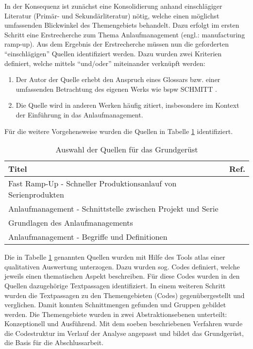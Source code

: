 In der Konsequenz ist zunächst eine Konsolidierung anhand einschlägiger Literatur (Primär- und Sekundärliteratur) nötig, welche einen möglichst umfassenden Blickwinkel des Themengebiets behandelt. Dazu erfolgt im ersten Schritt eine Erstrecherche zum Thema Anlaufmanagement (engl.: manufacturing ramp-up). Aus dem Ergebnis der Erstrecherche müssen nun die geforderten ``einschlägigen'' Quellen identifiziert werden. Dazu wurden zwei Kriterien definiert, welche mittels ``und/oder'' miteinander verknüpft werden: 
\begin{enumerate}
 \item Der Autor der Quelle erhebt den Anspruch eines Glossars bzw. einer umfassenden Betrachtung des eigenen Werks wie \gls{bspw} SCHMITT \autocite{Schmitt2015}. 
 \item Die Quelle wird in anderen Werken häufig zitiert, insbesondere im Kontext der Einführung in das Anlaufmanagement. 
\end{enumerate}

Für die weitere Vorgehensweise wurden die Quellen in Tabelle \ref{tab:quellengrundgeruest} identifiziert. 
% 
\begin{table}[h]
\caption{ Auswahl der Quellen für das Grundgerüst} \label{tab:quellengrundgeruest} 
\begin{center}
\begin{tabular}{l r}
\textbf{Titel} & \textbf{Ref.} \\ \hline
Fast Ramp-Up - Schneller Produktionsanlauf von Serienprodukten & \autocite{Kuhn2002} \\
Anlaufmanagement - Schnittstelle zwischen Projekt und Serie & \autocite{Bischoff2007} \\
Grundlagen des Anlaufmanagements & \autocite{Schuh2008} \\
Anlaufmanagement - Begriffe und Definitionen & \autocite{Schmitt2015} 
 \end{tabular} 
 \end{center}
\end{table}
% 
% 
Die in Tabelle \ref{tab:quellengrundgeruest} genannten Quellen wurden mit Hilfe des Tools \gls{atlas} 
einer qualitativen Auswertung unterzogen. Dazu wurden sog. Codes definiert, welche jeweils einen thematischen Aspekt beschreiben. Für diese Codes wurden in den Quellen dazugehörige Textpassagen identifiziert. In einem weiteren Schritt wurden die Textpassagen zu den Themengebieten (Codes) gegenübergestellt und verglichen. Damit konnten Schnittmengen gefunden und Gruppen gebildet werden. Die Themengebiete wurden in zwei Abstraktionsebenen unterteilt: Konzeptionell und Ausführend.
Mit dem soeben beschriebenen Verfahren wurde die Codestruktur im Verlauf der Analyse angepasst und bildet das Grundgerüst, die Basis für die Abschlussarbeit. 

